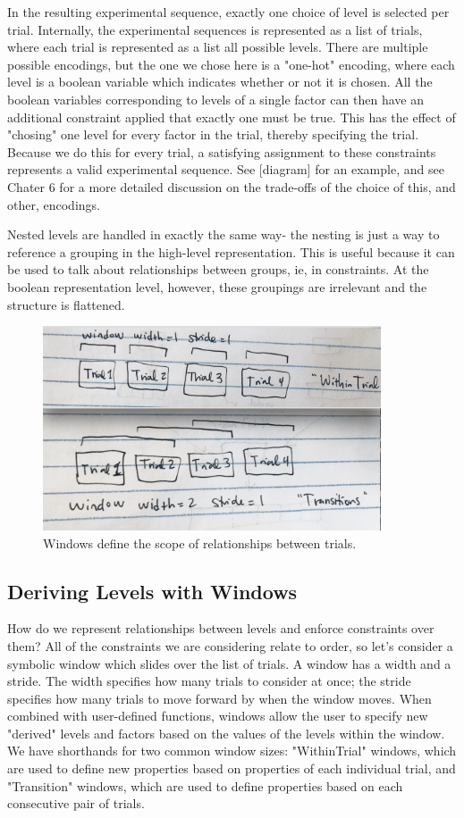 In the resulting experimental sequence, exactly one choice of level is selected per trial. Internally, the experimental sequences is represented as a list of trials, where each trial is represented as a list all possible levels. There are multiple possible encodings, but the one we chose here is a "one-hot" encoding, where each level is a boolean variable which indicates whether or not it is chosen. All the boolean variables corresponding to levels of a single factor can then have an additional constraint applied that exactly one must be true. This has the effect of "chosing" one level for every factor in the trial, thereby specifying the trial. Because we do this for every trial, a satisfying assignment to these constraints represents a valid experimental sequence. See [diagram] for an example, and see Chater 6 for a more detailed discussion on the trade-offs of the choice of this, and other, encodings.

Nested levels are handled in exactly the same way- the nesting is just a way to reference a grouping in the high-level representation. This is useful because it can be used to talk about relationships between groups, ie, in constraints. At the boolean representation level, however, these groupings are irrelevant and the structure is flattened.

\begin{figure}[t]
    \centerline{\includegraphics[origin=c,width=10cm]{fig_windows}}
    \caption{Windows define the scope of relationships between trials.}%
    \label{fig:windows}%
\end{figure}


\subsection{Deriving Levels with Windows}

How do we represent relationships between levels and enforce constraints over them? All of the constraints we are considering relate to order, so let's consider a symbolic window which slides over the list of trials. A window has a width and a stride. The width specifies how many trials to consider at once; the stride specifies how many trials to move forward by when the window moves. When combined with user-defined functions, windows allow the user to specify new "derived" levels and factors based on the values of the levels within the window. We have shorthands for two common window sizes: "WithinTrial" windows, which are used to define new properties based on properties of each individual trial, and "Transition" windows, which are used to define properties based on each consecutive pair of trials.

